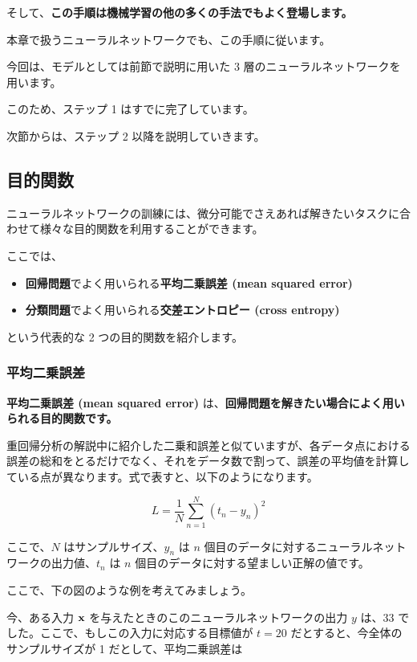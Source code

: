 そして、\textbf{この手順は機械学習の他の多くの手法でもよく登場します。}

本章で扱うニューラルネットワークでも、この手順に従います。


今回は、モデルとしては前節で説明に用いた 3 層のニューラルネットワークを用います。

このため、ステップ 1 はすでに完了しています。

次節からは、ステップ 2 以降を説明していきます。


\subsection{目的関数}


ニューラルネットワークの訓練には、微分可能でさえあれば解きたいタスクに合わせて様々な目的関数を利用することができます。

ここでは、


\begin{itemize}
\item \textbf{回帰問題}でよく用いられる\textbf{平均二乗誤差 (mean squared error)}
\item \textbf{分類問題}でよく用いられる\textbf{交差エントロピー (cross entropy)}
\end{itemize}


という代表的な 2 つの目的関数を紹介します。


\subsubsection{平均二乗誤差}


\textbf{平均二乗誤差 (mean squared error)} は、\textbf{回帰問題を解きたい場合によく用いられる目的関数です。}

重回帰分析の解説中に紹介した二乗和誤差と似ていますが、各データ点における誤差の総和をとるだけでなく、それをデータ数で割って、誤差の平均値を計算している点が異なります。式で表すと、以下のようになります。


\[
L = \frac{1}{N} \sum_{n=1}^N (t_n - y_n)^2
\]


ここで、$N$ はサンプルサイズ、$y_n$ は $n$ 個目のデータに対するニューラルネットワークの出力値、$t_n$ は $n$ 個目のデータに対する望ましい正解の値です。


ここで、下の図のような例を考えてみましょう。




今、ある入力 ${\bf x}$ を与えたときのこのニューラルネットワークの出力 $y$ は、$33$ でした。ここで、もしこの入力に対応する目標値が $t = 20$ だとすると、今全体のサンプルサイズが 1 だとして、平均二乗誤差は



